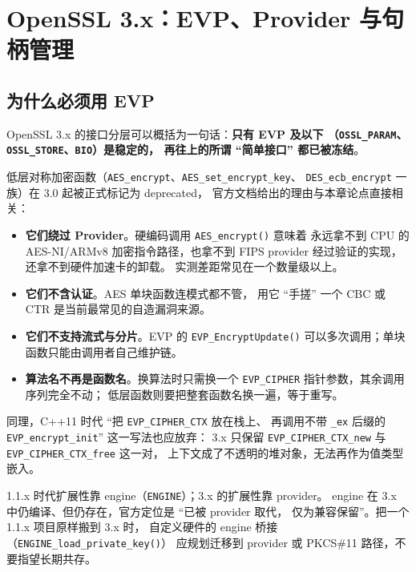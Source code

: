 \documentclass[12pt,a4paper,fontset=fandol]{ctexbook}
\newcommand{\cpp}[1]{C++#1}
\newcommand{\Fn}[1]{\texttt{#1()}}
\newcommand{\Tp}[1]{\texttt{#1}}
\begin{document}
\chapter{OpenSSL 3.x：EVP、Provider 与句柄管理}

\section{为什么必须用 EVP}

OpenSSL 3.x 的接口分层可以概括为一句话：\textbf{只有 EVP 及以下
（\Tp{OSSL\_PARAM}、\Tp{OSSL\_STORE}、\Tp{BIO}）是稳定的，
再往上的所谓 ``简单接口'' 都已被冻结}。

低层对称加密函数（\Tp{AES\_encrypt}、\Tp{AES\_set\_encrypt\_key}、
\Tp{DES\_ecb\_encrypt} 一族）在 3.0 起被正式标记为 deprecated，
官方文档给出的理由与本章论点直接相关：

\begin{itemize}
  \item \textbf{它们绕过 Provider}。硬编码调用 \Fn{AES\_encrypt} 意味着
        永远拿不到 CPU 的 AES-NI/ARMv8 加密指令路径，也拿不到
        FIPS provider 经过验证的实现，还拿不到硬件加速卡的卸载。
        实测差距常见在一个数量级以上。
  \item \textbf{它们不含认证}。AES 单块函数连模式都不管，
        用它 ``手搓'' 一个 CBC 或 CTR 是当前最常见的自造漏洞来源。
  \item \textbf{它们不支持流式与分片}。EVP 的 \Fn{EVP\_EncryptUpdate}
        可以多次调用；单块函数只能由调用者自己维护链。
  \item \textbf{算法名不再是函数名}。换算法时只需换一个
        \Tp{EVP\_CIPHER} 指针参数，其余调用序列完全不动；
        低层函数则要把整套函数名换一遍，等于重写。
\end{itemize}

同理，\cpp{11} 时代 ``把 \Tp{EVP\_\allowbreak{}CIPHER\_\allowbreak{}CTX} 放在栈上、
再调用不带 \texttt{\_ex} 后缀的 \Tp{EVP\_\allowbreak{}encrypt\_\allowbreak{}init}'' 这一写法也应放弃：
3.x 只保留 \texttt{EVP\_\allowbreak{}CIPHER\_\allowbreak{}CTX\allowbreak\_\allowbreak{}new} 与
\texttt{EVP\_\allowbreak{}CIPHER\_\allowbreak{}CTX\allowbreak\_\allowbreak{}free} 这一对，
上下文成了不透明的堆对象，无法再作为值类型嵌入。

\begin{warning}[title=版本断层：1.1.x 的写法在 3.x 上不只是 ``能用'' 而已]
1.1.x 时代扩展性靠 engine（\Tp{ENGINE}）；3.x 的扩展性靠 provider。
engine 在 3.x 中仍编译、但仍存在，官方定位是 ``已被 provider 取代，
仅为兼容保留''。把一个 1.1.x 项目原样搬到 3.x 时，
自定义硬件的 engine 桥接（\Fn{ENGINE\_load\_private\_key}）
应规划迁移到 provider 或 PKCS\#11 路径，不要指望长期共存。
\end{warning}
\end{document}
